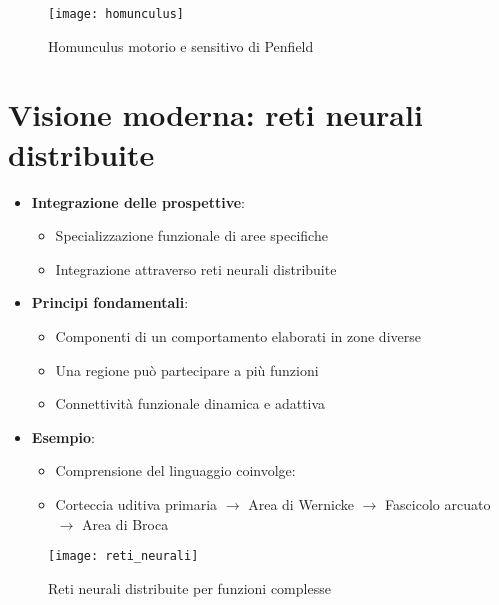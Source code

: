 \documentclass[11pt]{article}
\begin{document}
\begin{figure}[h]
    \centering
    \texttt{[image: homunculus]} %
    \caption{Homunculus motorio e sensitivo di Penfield}
    \label{fig:homunculus}
\end{figure}

\section*{Visione moderna: reti neurali distribuite}

\begin{itemize}
    \item \textbf{Integrazione delle prospettive}:
    \begin{itemize}
        \item Specializzazione funzionale di aree specifiche
        \item Integrazione attraverso reti neurali distribuite
    \end{itemize}
    
    \item \textbf{Principi fondamentali}:
    \begin{itemize}
        \item Componenti di un comportamento elaborati in zone diverse
        \item Una regione può partecipare a più funzioni
        \item Connettività funzionale dinamica e adattiva
    \end{itemize}
    
    \item \textbf{Esempio}: 
    \begin{itemize}
        \item Comprensione del linguaggio coinvolge:
        \item Corteccia uditiva primaria $\rightarrow$ Area di Wernicke $\rightarrow$ Fascicolo arcuato $\rightarrow$ Area di Broca
    \end{itemize}
\end{itemize}

\begin{figure}[h]
    \centering
    \texttt{[image: reti\_neurali]} %
    \caption{Reti neurali distribuite per funzioni complesse}
    \label{fig:reti}
\end{figure}
\end{document}
